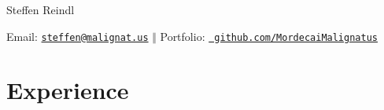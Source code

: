 \documentclass[a4paper]{article}
\def\name{Steffen Reindl}
\begin{document}
\begin{minipage}{0.30\linewidth}
  {\huge \name}
\end{minipage}
\begin{minipage}{0.75\linewidth}
  \begin{flushright}
    Email: \href{mailto:steffen@malignat.us}{\tt steffen@malignat.us} $\Vert$
    Portfolio: \href{https://github.com/MordecaiMalignatus/}{\tt
      github.com/MordecaiMalignatus}
  \end{flushright}
\end{minipage}

\section*{Experience}
\end{document}
